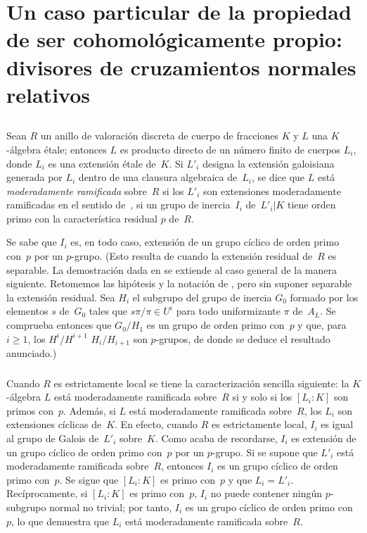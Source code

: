 
\section[Un caso particular: ser cohomológicamente propio]{Un caso particular de la
propiedad de ser cohomológicamente propio: divisores de cruzamientos normales relativos}
\label{XIII.2}

\setcounter{subsection}{-1}

\subsection{}
\label{XIII.2.0}
Sean $R$ un anillo de valoración discreta de cuerpo de fracciones $K$ y $L$
una $K$-álgebra étale; entonces $L$ es producto directo de un número finito
de cuerpos $L_i$, donde $L_i$ es una extensión étale de~$K$. Si $L'_i$
designa la extensión galoisiana generada por $L_i$ dentro de una clausura
algebraica de~$L_i$, se dice que $L$ está \emph{moderadamente ramificada}
%
sobre~$R$ si los $L'_i$ son extensiones moderadamente ramificadas en el
sentido de~, \ie si un grupo de inercia~$I_i$ de~$L'_i|K$ tiene
orden primo con la característica residual $p$ de~$R$.

Se sabe que $I_i$ es, en todo caso, extensión de un grupo cíclico de orden
primo con~$p$ por un $p$-grupo. (Esto resulta de
\cite[ch\ptbl IV prop cor]{XIII.5} cuando la extensión residual
de~$R$ es separable. La demostración dada en \loccit se extiende al caso
general de la manera siguiente. Retomemos las hipótesis y la notación de
\loccit, pero sin suponer separable la extensión residual. Sea $H_i$ el
subgrupo del grupo de inercia $G_0$ formado por los elementos $s$ de~$G_0$
tales que $s\pi/\pi\in U^i$ para todo uniformizante $\pi$ de~$A_L$. Se
comprueba entonces que $G_0/H_1$ es un grupo de orden primo con~$p$ y que, para
$i\geqslant 1$, los
{$H^i/H^{i+1}$}
{$H_i/H_{i+1}$}
son $p$-grupos, de donde se deduce el resultado anunciado.)

\subsubsection{}
\label{XIII.2.0.1}
Cuando $R$ es estrictamente local se tiene la caracterización sencilla
siguiente: la $K$-álgebra $L$ está moderadamente ramificada sobre~$R$ si y
solo si los $[L_i:K]$ son primos con~$p$. Además, si $L$ está moderadamente
ramificada sobre~$R$, los $L_i$ son extensiones cíclicas de~$K$. En efecto,
cuando $R$ es estrictamente local, $I_i$ es igual al grupo de Galois
de~$L'_i$ sobre~$K$. Como acaba de recordarse, $I_i$ es extensión de un grupo
cíclico de orden primo con~$p$ por un $p$-grupo. Si se supone que $L'_i$ está
moderadamente ramificada sobre~$R$, entonces $I_i$ es un grupo cíclico de
orden primo con~$p$. Se sigue que $[L_i:K]$ es primo con~$p$ y que $L_i=L'_i$.
Recíprocamente, si $[L_i:K]$ es primo con~$p$, $I_i$ no puede contener ningún
$p$-subgrupo normal no trivial; por tanto, $I_i$ es un grupo cíclico de orden
primo con~$p$, lo que demuestra que $L_i$ está moderadamente ramificada
sobre~$R$.


